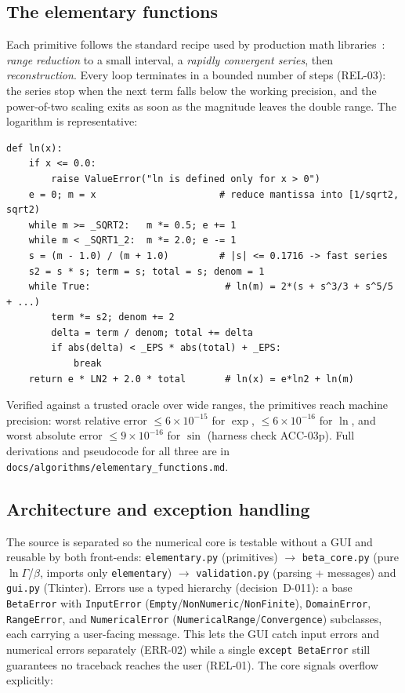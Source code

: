 \documentclass[11pt,a4paper]{article}
\begin{document}
\subsection{The elementary functions}
Each primitive follows the standard recipe used by production math
libraries~\cite{muller2016elementary,cody1980software}: \emph{range reduction} to
a small interval, a \emph{rapidly convergent series}, then \emph{reconstruction}.
Every loop terminates in a bounded number of steps (REL-03): the series stop when
the next term falls below the working precision, and the power-of-two scaling
exits as soon as the magnitude leaves the double range. The logarithm is
representative:

\begin{lstlisting}[style=py]
def ln(x):
    if x <= 0.0:
        raise ValueError("ln is defined only for x > 0")
    e = 0; m = x                      # reduce mantissa into [1/sqrt2, sqrt2)
    while m >= _SQRT2:   m *= 0.5; e += 1
    while m < _SQRT1_2:  m *= 2.0; e -= 1
    s = (m - 1.0) / (m + 1.0)         # |s| <= 0.1716 -> fast series
    s2 = s * s; term = s; total = s; denom = 1
    while True:                        # ln(m) = 2*(s + s^3/3 + s^5/5 + ...)
        term *= s2; denom += 2
        delta = term / denom; total += delta
        if abs(delta) < _EPS * abs(total) + _EPS:
            break
    return e * LN2 + 2.0 * total       # ln(x) = e*ln2 + ln(m)
\end{lstlisting}

\noindent Verified against a trusted oracle over wide ranges, the primitives
reach machine precision: worst relative error $\le 6\times10^{-15}$ for $\exp$,
$\le 6\times10^{-16}$ for $\ln$, and worst absolute error $\le 9\times10^{-16}$
for $\sin$ (harness check ACC-03p). Full derivations and pseudocode for all three
are in \texttt{docs/algorithms/elementary\_functions.md}.

\subsection{Architecture and exception handling}
The source is separated so the numerical core is testable without a GUI and
reusable by both front-ends: \texttt{elementary.py} (primitives) $\rightarrow$
\texttt{beta\_core.py} (pure $\ln\Gamma$/$\beta$, imports only
\texttt{elementary}) $\rightarrow$ \texttt{validation.py} (parsing + messages)
and \texttt{gui.py} (Tkinter). Errors use a typed hierarchy
(decision~D-011): a base \texttt{BetaError} with \texttt{InputError}
(\texttt{Empty}/\texttt{NonNumeric}/\texttt{NonFinite}), \texttt{DomainError},
\texttt{RangeError}, and \texttt{NumericalError}
(\texttt{NumericalRange}/\texttt{Convergence}) subclasses, each carrying a
user-facing message. This lets the GUI catch input errors and numerical errors
separately (ERR-02) while a single \texttt{except BetaError} still guarantees no
traceback reaches the user (REL-01). The core signals overflow explicitly:
\end{document}
